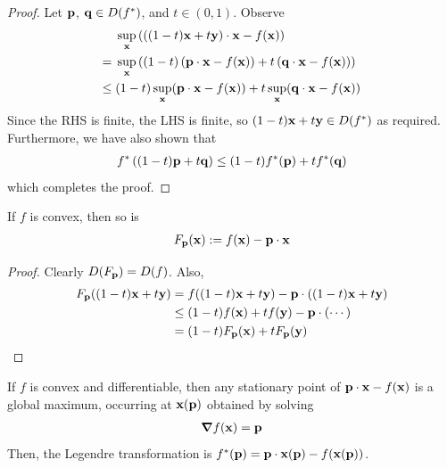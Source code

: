 \documentclass{../template/note}
\begin{document}
    \begin{proof}
        Let $\V p$, $\V q \in D(f^*)$, and $t \in (0, 1)$. Observe
        \begin{align*}
            &\;\sup_{\V x} \left(\left((1-t)\V x + t\V y\right) \cdot \V x - f(\V x)\right) \\
            =&\; \sup_{\V x} \left((1-t)\left(\V p \cdot \V x - f(\V x)\right) + t\left(\V q \cdot \V x - f(\V x)\right)\right) \\
            \leq&\; (1-t) \sup_{\V x} (\V p \cdot \V x - f(\V x)) + t \sup_{\V x} (\V q \cdot \V x - f(\V x))
        \end{align*}
        Since the RHS is finite, the LHS is finite, so $(1-t)\V x + t\V y \in D(f^*)$ as required. Furthermore, we have also shown that
        \begin{align*}
            f^*\left((1-t)\V p + t\V q\right) \leq (1-t)f^*(\V p) + tf^*(\V q)
        \end{align*}
        which completes the proof.
    \end{proof}
    
    \begin{lemma}
        If $f$ is convex, then so is
        \begin{align*}
            F_{\V p}(\V x) := f(\V x) - \V p \cdot \V x
        \end{align*}
    \end{lemma}
    
    \begin{proof}
        Clearly $D(F_{\V p}) = D(f)$. Also,
        \begin{align*}
            F_{\V p}((1-t)\V x + t\V y) &= f((1-t) \V x + t\V y) - \V p \cdot ((1-t)\V x + t\V y) \\
            &\leq (1-t)f(\V x) + tf(\V y) - \V p \cdot (\cdots) \\
            &= (1-t)F_{\V p}(\V x) + tF_{\V p}(\V y)
        \end{align*}
    \end{proof}
    
    \begin{corollary}
        \label{magic-formula}
        If $f$ is convex and differentiable, then any stationary point of $\V p \cdot \V x - f(\V x)$ is a global maximum, occurring at $\V x(\V p)$ obtained by solving
        \begin{align*}
            \grad f(\V x) = \V p
        \end{align*}
        Then, the Legendre transformation is $f^*(\V p) = \V p \cdot \V x(\V p) - f(\V x(\V p))$.        
    \end{corollary}
    
\end{document}
